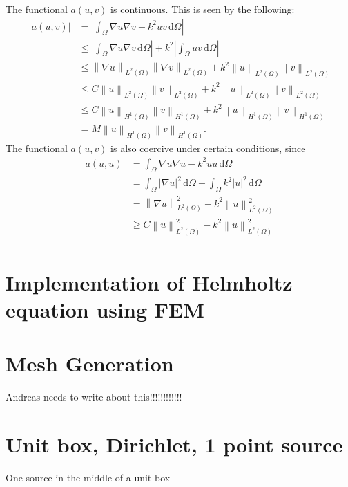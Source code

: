\documentclass[10pt,a4paper]{article}
\newcommand{\vectornorm}[1]{\left\|#1\right\|}
\begin{document}
The functional $a(u,v)$ is continuous. This is seen by the following:
\begin{align*}
|a(u,v)| &= |\int_\Omega  \nabla u \nabla v - k^2 u v \, \mathrm{d} \Omega| \\
 		& \leq |\int_\Omega \nabla u \nabla v \, \mathrm{d} \Omega| + k^2 |\int_\Omega u v \, \mathrm{d} \Omega| \\
 		& \leq \vectornorm{\nabla u}_{L^2(\Omega)} \vectornorm{\nabla v}_{L^2(\Omega)} + k^2 \vectornorm{u}_{L^2(\Omega)} \vectornorm{v}_{L^2(\Omega)} \\
 		& \leq C \vectornorm{u}_{L^2(\Omega)} \vectornorm{v}_{L^2(\Omega)} + k^2 \vectornorm{u}_{L^2(\Omega)} \vectornorm{v}_{L^2(\Omega)} \\
 		& \leq C \vectornorm{u}_{H^1(\Omega)} \vectornorm{v}_{H^1(\Omega)} + k^2 \vectornorm{u}_{H^1(\Omega)} \vectornorm{v}_{H^1(\Omega)} \\
 		& = M \vectornorm{u}_{H^1(\Omega)} \vectornorm{v}_{H^1(\Omega)}.
\end{align*}
The functional $a(u,v)$ is also coercive under certain conditions, since
\begin{align*}
a(u,u) &= \int_\Omega  \nabla u \nabla u - k^2 u u \, \mathrm{d} \Omega \\
 		& = \int_\Omega  |\nabla u|^2 \, \mathrm{d} \Omega - \int_{\Omega} k^2 |u|^2 \, \mathrm{d} \Omega \\
 		& =  \vectornorm{\nabla u}_{L^2(\Omega)}^2 - k^2 \vectornorm{u}_{L^2(\Omega)}^2\\
 		& \geq C\vectornorm{u}_{L^2(\Omega)}^2  - k^2 \vectornorm{u}_{L^2(\Omega)}^2\\
\end{align*}

\section*{Implementation of Helmholtz equation using FEM}


\section*{Mesh Generation}
Andreas needs to write about this!!!!!!!!!!!!

\section*{Unit box, Dirichlet, 1 point source}
One source in the middle of a unit box
\end{document}
